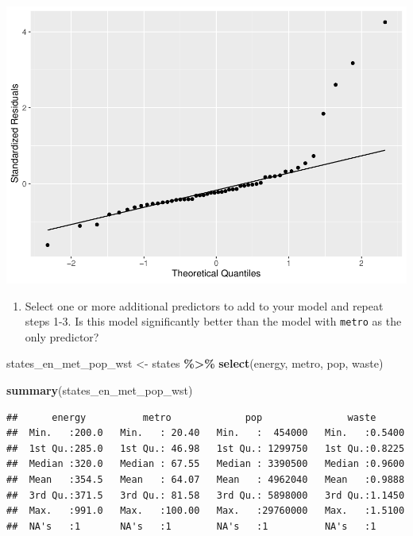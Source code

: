 \documentclass[
]{book}
\newenvironment{Shaded}{\begin{snugshade}}{\end{snugshade}}
\newcommand{\KeywordTok}[1]{\textcolor[rgb]{0.13,0.29,0.53}{\textbf{#1}}}
\newcommand{\NormalTok}[1]{#1}
\newcommand{\OperatorTok}[1]{\textcolor[rgb]{0.81,0.36,0.00}{\textbf{#1}}}
\newcommand{\StringTok}[1]{\textcolor[rgb]{0.31,0.60,0.02}{#1}}
\providecommand{\tightlist}{%
  \setlength{\itemsep}{0pt}\setlength{\parskip}{0pt}}
\begin{document}
\begin{alert}
\includegraphics{R/Rmodels/figures/unnamed-chunk-110-2.pdf}

\begin{enumerate}
\def\labelenumi{\arabic{enumi}.}
\setcounter{enumi}{3}
\tightlist
\item
  Select one or more additional predictors to add to your model and repeat steps 1-3. Is this model significantly better than the model with \texttt{metro} as the only predictor?
\end{enumerate}

\begin{Shaded}
\begin{Highlighting}[]
\NormalTok{  states\_en\_met\_pop\_wst \textless{}{-}}\StringTok{ }
\StringTok{      }\NormalTok{states }\OperatorTok{\%\textgreater{}\%}
\StringTok{      }\KeywordTok{select}\NormalTok{(energy, metro, pop, waste)}

  \KeywordTok{summary}\NormalTok{(states\_en\_met\_pop\_wst)}
\end{Highlighting}
\end{Shaded}

\begin{verbatim}
##      energy          metro             pop               waste       
##  Min.   :200.0   Min.   : 20.40   Min.   :  454000   Min.   :0.5400  
##  1st Qu.:285.0   1st Qu.: 46.98   1st Qu.: 1299750   1st Qu.:0.8225  
##  Median :320.0   Median : 67.55   Median : 3390500   Median :0.9600  
##  Mean   :354.5   Mean   : 64.07   Mean   : 4962040   Mean   :0.9888  
##  3rd Qu.:371.5   3rd Qu.: 81.58   3rd Qu.: 5898000   3rd Qu.:1.1450  
##  Max.   :991.0   Max.   :100.00   Max.   :29760000   Max.   :1.5100  
##  NA's   :1       NA's   :1        NA's   :1          NA's   :1
\end{verbatim}


\end{alert}
\end{document}
